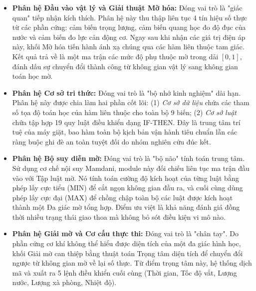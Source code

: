 \documentclass[12pt, a4paper]{article}
\begin{document}
\begin{itemize}
    \item \textbf{Phân hệ Đầu vào vật lý và Giải thuật Mờ hóa:} Đóng vai trò là "giác quan" tiếp nhận kích thích. Phân hệ này thu thập liên tục 4 tín hiệu số thực từ các phần cứng: cảm biến trọng lượng, cảm biến quang học đo độ đục của nước và cảm biến đo lực cản động cơ. Ngay sau khi nhận các giá trị điện áp này, khối Mờ hóa tiến hành ánh xạ chúng qua các hàm liên thuộc tam giác. Kết quả trả về là một ma trận các mức độ phụ thuộc mờ trong dải $[0, 1]$, đánh dấu sự chuyển đổi thành công từ không gian vật lý sang không gian toán học mờ.
    \item \textbf{Phân hệ Cơ sở tri thức:} Đóng vai trò là "bộ nhớ kinh nghiệm" dài hạn. Phân hệ này được chia làm hai phần cốt lõi: (1) \textit{Cơ sở dữ liệu} chứa các tham số tọa độ toán học của hàm liên thuộc cho toàn bộ 9 biến; (2) \textit{Cơ sở luật} chứa tập hợp 19 quy luật điều khiển dạng IF-THEN. Đây là trung tâm trí tuệ của máy giặt, bao hàm toàn bộ kịch bản vận hành tiêu chuẩn lẫn các ràng buộc ghi đè an toàn tuyệt đối do nhóm nghiên cứu đúc kết.
    \item \textbf{Phân hệ Bộ suy diễn mờ:} Đóng vai trò là "bộ não" tính toán trung tâm. Sử dụng cơ chế nội suy Mamdani, module này đối chiếu liên tục ma trận đầu vào với Tập luật mờ. Nó tính toán cường độ kích hoạt của từng luật bằng phép lấy cực tiểu (MIN) để cắt ngọn không gian đầu ra, và cuối cùng dùng phép lấy cực đại (MAX) để chồng chập toàn bộ các luật được kích hoạt thành một Đa giác mờ tổng hợp. Điểm ưu việt là khả năng đánh giá đồng thời nhiều trạng thái giao thoa mà không bỏ sót điều kiện vi mô nào.
    \item \textbf{Phân hệ Giải mờ và Cơ cấu thực thi:} Đóng vai trò là "chân tay". Do phần cứng cơ khí không thể hiểu được diện tích của một đa giác hình học, khối Giải mờ can thiệp bằng thuật toán Trọng tâm diện tích để chuyển đổi ngược từ không gian mờ về lại số thực. Từ điểm trọng tâm này, hệ thống dịch mã và xuất ra 5 lệnh điều khiển cuối cùng (Thời gian, Tốc độ vắt, Lượng nước, Lượng xà phòng, Nhiệt độ).
\end{itemize}
\end{document}
